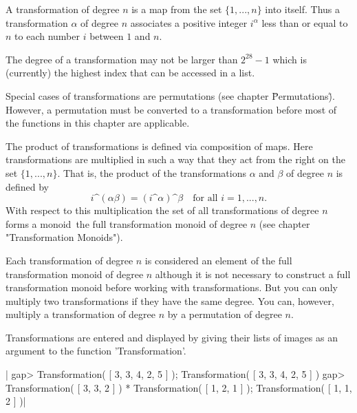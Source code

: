 
A transformation of degree  $n$ is a  map from the  set $\{1,  ... , n\}$
into itself.   Thus a transformation $\alpha$  of degree $n$ associates a
positive integer $i^\alpha$ less than or equal  to $n$ to each number $i$
between $1$ and $n$.

The degree of a transformation may not be larger than $2^{28}-1$ which is
(currently) the highest index that can be accessed in a list.

Special   cases  of    transformations   are permutations    (see chapter
\"Permutations\").  However,  a   permutation must   be  converted to   a
transformation before  most   of  the  functions   in  this  chapter  are
applicable.

The product of transformations is defined via  composition of maps.  Here
transformations are multiplied in such a way that they act from the right
on   the set  $\{1,    ... ,   n\}$.   That   is,  the  product  of   the
transformations $\alpha$ and $\beta$ of degree $n$ is defined by
\[
  i\^(\alpha\beta) = (i\^\alpha)\^\beta\quad\mbox{for all }i = 1, ... ,n.
\]
With respect  to this  multiplication  the set of all  transformations of
degree $n$ forms a monoid\:\ the full transformation monoid of degree $n$
(see chapter "Transformation Monoids").

Each transformation of  degree $n$ is  considered an element of  the full
transformation  monoid  of degree  $n$ although   it is  not necessary to
construct  a   full  transformation     monoid  before   working     with
transformations.  But you can  only multiply two transformations  if they
have the same  degree.  You  can,  however, multiply a transformation  of
degree $n$ by a permutation of degree $n$.

Transformations are entered and displayed by giving their lists of images
as an argument to the function 'Transformation'.

|    gap> Transformation( [ 3, 3, 4, 2, 5 ] );
    Transformation( [ 3, 3, 4, 2, 5 ] )
    gap> Transformation( [ 3, 3, 2 ] ) * Transformation( [ 1, 2, 1 ] );
    Transformation( [ 1, 1, 2 ] )|

